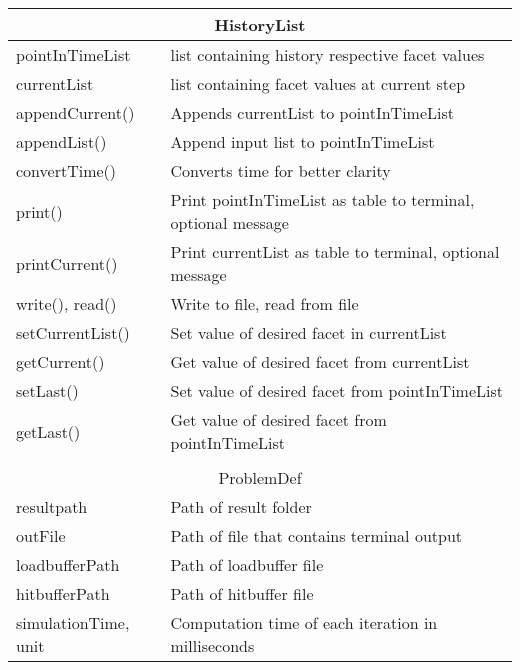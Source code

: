 \begin{center}
\begin{tabular}{|l|l|}
\hline
\multicolumn{2}{|c|}{\rule{0pt}{3ex}HistoryList}\\
\hline
\rule{0pt}{3ex} pointInTimeList& list containing history respective facet values\\
\rule{0pt}{3ex} currentList& list containing facet values at current step\\
\hline
\rule{0pt}{3ex} appendCurrent()& Appends currentList to pointInTimeList\\
\rule{0pt}{3ex} appendList()& Append input list to pointInTimeList\\
\rule{0pt}{3ex} convertTime()& Converts time for better clarity\\
\rule{0pt}{3ex} print()& Print pointInTimeList as table to terminal, optional message\\
\rule{0pt}{3ex} printCurrent()& Print currentList as table to terminal, optional message\\
\rule{0pt}{3ex} write(), read()& Write to file, read from file\\
\rule{0pt}{3ex} setCurrentList()& Set value of desired facet in currentList\\
\rule{0pt}{3ex} getCurrent()& Get value of desired facet from currentList\\
\rule{0pt}{3ex} setLast()& Set value of desired facet from pointInTimeList\\
\rule{0pt}{3ex} getLast()& Get value of desired facet from pointInTimeList\\
\hline
\multicolumn{2}{l}{}\\[1ex]
\hline
\multicolumn{2}{|c|}{\rule{0pt}{3ex}ProblemDef}\\
\hline
\rule{0pt}{3ex} resultpath& Path of result folder\\
\rule{0pt}{3ex} outFile& Path of file that contains terminal output\\
\rule{0pt}{3ex} loadbufferPath& Path of loadbuffer file\\
\rule{0pt}{3ex} hitbufferPath& Path of hitbuffer file\\
\rule{0pt}{3ex} simulationTime, unit& \multirow{2}{*}{Computation time of each iteration in milliseconds}\\

\end{tabular}
\end{center}
